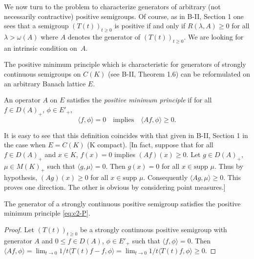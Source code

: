 We now turn to the problem to characterize generators of arbitrary (not necessarily contractive) positive semigroups.
Of course, as in B-II, Section 1 
one sees that a semigroup $(T(t))_{t \geq 0}$ is positive if and only if $R(\lambda,A) \geq 0$ for all $\lambda > \omega(A)$ where $A$ denotes the generator of $(T(t))_{t \geq 0}$.
We are looking for an intrinsic condition on~$A$.

The positive minimum principle which is characteristic for generators of strongly continuous semigroups on $C(K)$ (see 
B-II, Theorem 1.6) can be reformulated on an arbitrary Banach lattice $E$.
\begin{definition}\label{def:c2-1.6}
%
%
%
An operator $A$ on $E$ satisfies the \emph{positive minimum principle} if for all $f \in D(A)_{+}$, $\phi \in E'_{+}$,
\begin{equation}\label{eq:c2-P} \tag{P}
\langle f,\phi \rangle = 0 \quad \text{implies} \quad \langle Af,\phi \rangle \geq 0  .
\end{equation}
\end{definition}
\begin{remark*}\label{rem:c2-1.6}
%
%
It is easy to see that this definition coincides with that given in B-II, Section 1 
in the case when $E = C(K)$ (K compact).
[In fact, suppose that for all $f \in D(A)_{+}$ and $x \in K$, $f(x) = 0$ implies $(Af)(x) \geq 0$.
Let $g \in D(A)_{+}$, $\mu \in M(K)_{+}$ such that $\langle g,\mu \rangle = 0$.
Then $g(x) = 0$ for all $x \in \text{supp } \mu$.
Thus by hypothesis, $(Ag)(x) \geq 0$ for all $x \in \text{supp } \mu$.
Consequently $\langle Ag,\mu \rangle \geq 0$.
This proves one direction.
The other is obvious by considering point measures.]
\end{remark*}
\begin{proposition}\label{prop:c2-1.7}
%
%
The generator of a strongly continuous positive semigroup satisfies the positive minimum principle  \eqref{eq:c2-P}.  
\end{proposition}
\begin{proof}
Let $(T(t))_{t \geq 0}$ be a strongly continuous positive semigroup with generator $A$ and $0 \leq f \in D(A)$, $\phi \in E'_{+}$ such that $\langle f,\phi \rangle = 0$.
Then $\langle Af,\phi \rangle = \lim_{t \to 0} 1/t \langle T(t)f - f, \phi \rangle = \lim_{t \to 0} 1/t \langle T(t)f, \phi \rangle \geq 0$.
\end{proof}
